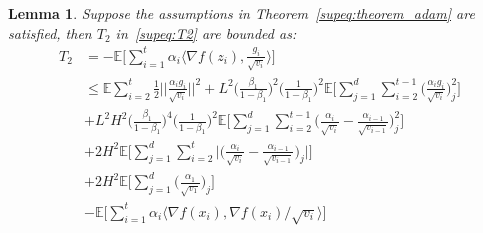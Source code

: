 \documentclass{article}
\newtheorem{lemma}[theorem]{Lemma}
\begin{document}
\begin{lemma} \cite{chen2018convergence}
\label{suplemma:6.7}
Suppose the assumptions in Theorem~\ref{supeq:theorem_adam} are satisfied, then $T_2$ in~\eqref{supeq:T2} are bounded as:
\begin{align}
\label{supeq:T2_bound}
T_2 &= - \mathbb{E} \Big[ \sum_{i=1}^t \alpha_i \langle \nabla f(z_i), \frac{g_i}{\sqrt{v_i}} \rangle \Big] \nonumber \\
&\leq \mathbb{E} \sum_{i=2}^t \frac{1}{2} \Big \vert \Big \vert \frac{\alpha_i g_i}{\sqrt{v_i}} \Big \vert \Big \vert^2 + L^2 \Big( \frac{\beta_1}{1-\beta_1} \Big)^2 \Big( \frac{1}{1-\beta_1} \Big)^2 \mathbb{E} \Bigg[ \sum_{j=1}^d \sum_{i=2}^{t-1} \Big( \frac{\alpha_i g_i}{ \sqrt{v_i}} \Big)^2_j \Bigg] \nonumber \\
&+ L^2 H^2 \Big( \frac{\beta_1}{1-\beta_1} \Big)^4 \Big( \frac{1}{1-\beta_1} \Big)^2 \mathbb{E} \Bigg[ \sum_{j=1}^d \sum_{i=2}^{t-1} \Big( \frac{\alpha_i}{\sqrt{v_i}} - \frac{\alpha_{i-1}}{\sqrt{v_{i-1}}} \Big)^2_j \Bigg] \nonumber \\
&+ 2H^2\mathbb{E} \Bigg[ \sum_{j=1}^d \sum_{i=2}^t \Bigg \vert \Big( \frac{\alpha_i}{\sqrt{v_i}} - \frac{\alpha_{i-1}}{\sqrt{v_{i-1}}} \Big)_j \Bigg \vert \Bigg] \nonumber \\
&+ 2H^2 \mathbb{E} \Bigg[ \sum_{j=1}^d \Big( \frac{\alpha_1}{\sqrt{v_1}} \Big)_j \Bigg] \nonumber \\
&- \mathbb{E} \Bigg[ \sum_{i=1}^t \alpha_i \langle \nabla f(x_i), \nabla f(x_i) / \sqrt{v_i} \rangle \Bigg]
\end{align}
\end{lemma}
\end{document}
